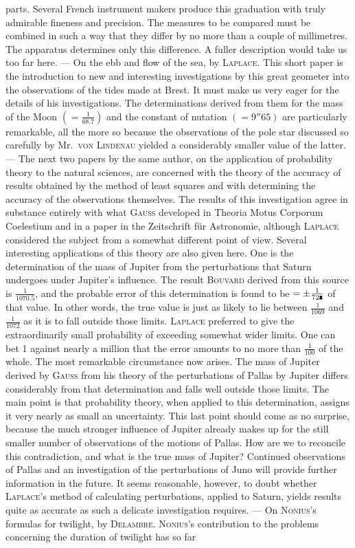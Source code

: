 parts. Several French instrument makers produce this graduation with truly admirable fineness and precision. The measures to be compared must be combined in such a way that they differ by no more than a couple of millimetres. The apparatus determines only this difference. A fuller description would take us too far here. --- On the ebb and flow of the sea, by \textsc{Laplace}. This short paper is the introduction to new and interesting investigations by this great geometer into the observations of the tides made at Brest. It must make us very eager for the details of his investigations. The determinations derived from them for the mass of the Moon $(= \frac{1}{68.7})$ and the constant of nutation $(= 9''65)$ are particularly remarkable, all the more so because the observations of the pole star discussed so carefully by Mr.\ \textsc{von Lindenau} yielded a considerably smaller value of the latter. --- The next two papers by the same author, on the application of probability theory to the natural sciences, are concerned with the theory of the accuracy of results obtained by the method of least squares and with determining the accuracy of the observations themselves. The results of this investigation agree in substance entirely with what \textsc{Gauss} developed in Theoria Motus Corporum Coelestium and in a paper in the Zeitschrift für Astronomie, although \textsc{Laplace} considered the subject from a somewhat different point of view. Several interesting applications of this theory are also given here. One is the determination of the mass of Jupiter from the perturbations that Saturn undergoes under Jupiter’s influence. The result \textsc{Bouvard} derived from this source is $\frac{1}{1070.5}$, and the probable error of this determination is found to be $= \pm \frac{1}{72\ObservedJupiterErrorMark}$ of that value. In other words, the true value is just as likely to lie between $\frac{1}{1069}$ and $\frac{1}{1072}$ as it is to fall outside those limits. \textsc{Laplace} preferred to give the extraordinarily small probability of exceeding somewhat wider limits. One can bet 1 against nearly a million that the error amounts to no more than $\frac{1}{100}$ of the whole. The most remarkable circumstance now arises. The mass of Jupiter derived by \textsc{Gauss} from his theory of the perturbations of Pallas by Jupiter differs considerably from that determination and falls well outside those limits. The main point is that probability theory, when applied to this determination, assigns it very nearly as small an uncertainty. This last point should come as no surprise, because the much stronger influence of Jupiter already makes up for the still smaller number of observations of the motions of Pallas. How are we to reconcile this contradiction, and what is the true mass of Jupiter? Continued observations of Pallas and an investigation of the perturbations of Juno will provide further information in the future. It seems reasonable, however, to doubt whether \textsc{Laplace}’s method of calculating perturbations, applied to Saturn, yields results quite as accurate as such a delicate investigation requires. --- On \textsc{Nonius}’s formulas for twilight, by \textsc{Delambre}. \textsc{Nonius}’s contribution to the problems concerning the duration of twilight has so far 